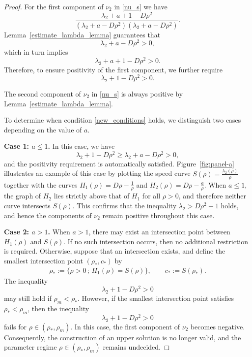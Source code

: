 \documentclass[11pt]{article}
\theoremstyle{definition}
\begin{document}
\begin{proof}
For the first component of $\nu_2$ in \eqref{nu_s} we have
\[
\frac{\lambda_2 + a + 1 - D\rho^{2}}{(\lambda_2 + a - D\rho^{2})(\lambda_2 + a - D\rho^{2})}.
\]
Lemma~\ref{estimate_lambda_lemma} guarantees that
\[
\lambda_2 + a - D\rho^{2} > 0,
\]
which in turn implies 
\[
\lambda_2 + a + 1 - D\rho^{2} > 0.
\]
Therefore, to ensure positivity of the first component, we further require
\begin{equation}\label{new_conditions}
    \lambda_2 + 1 - D\rho^{2} > 0.
\end{equation}

The second component of $\nu_2$ in \eqref{nu_s} is always positive by Lemma~\ref{estimate_lambda_lemma}.

To determine when condition \eqref{new_conditions} holds, we distinguish two cases depending on the value of $a$.

\medskip
\noindent \textbf{Case 1: $a \le 1$.}
In this case, we have
\[
\lambda_2 +1 - D\rho^2 \geq \lambda_2 +a - D\rho^2 >0, \]
and the positivity requirement is automatically satisfied.  
Figure~\ref{fig:panel-a} illustrates an example of this case by plotting the speed curve 
$S(\rho)=\frac{\lambda_2(\rho)}{\rho}$ together with the curves 
$H_1(\rho)=D\rho - \frac{1}{\rho}$ and $H_2(\rho)=D\rho - \frac{a}{\rho}$.  
When $a \le 1$, the graph of $H_2$ lies strictly above that of $H_1$ for all 
$\rho>0$, and therefore neither curve intersects $S(\rho)$. This confirms that the inequality $\lambda_2 > D\rho^{2} - 1$ 
holds, and hence the components of $\nu_2$ remain positive throughout 
this case.

\medskip
\noindent\textbf{Case 2: $a > 1$.}
When $a>1$, there may exist an intersection point between $H_{1}(\rho)$ and
$S(\rho)$. If no such intersection occurs, then no additional restriction is
required. Otherwise, suppose that an intersection exists, and define the
smallest intersection point $(\rho_{*},c_{*})$ by
\begin{align}\label{rho_*_definition}
    \rho_{*} := \{\rho>0 \,;\, H_{1}(\rho)=S(\rho)\},
    \qquad
    c_{*} := S(\rho_{*}).
\end{align}
The inequality
\[
\lambda_{2}+1-D\rho^{2} > 0
\]
may still hold if $\rho_{m}<\rho_{*}$. However, if the smallest intersection
point satisfies $\rho_{*}<\rho_{m}$, then the inequality
\[
\lambda_{2}+1-D\rho^{2} > 0
\]
fails for $\rho\in(\rho_{*},\rho_{m})$. In this case, the first component of
$\nu_{2}$ becomes negative. Consequently, the construction of an upper solution
is no longer valid, and the parameter regime $\rho\in(\rho_{*},\rho_{m})$
remains undecided.

\end{proof}
\end{document}
